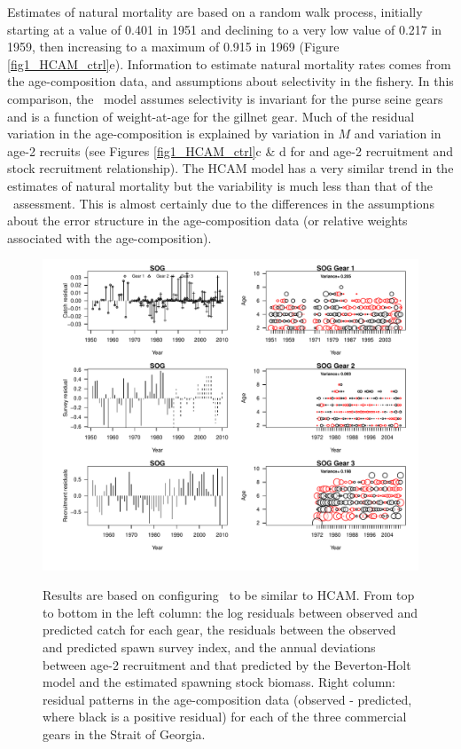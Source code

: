 Estimates of natural mortality are based on a random walk process, initially starting at a value of 0.401 in 1951 and declining to a very low value of 0.217 in 1959, then increasing to a maximum of 0.915 in 1969 (Figure \ref{fig1_HCAM_ctrl}e).  Information to estimate natural mortality rates comes from the age-composition data, and assumptions about selectivity in the fishery.  In this comparison, the \iscam\ model assumes selectivity is invariant for the purse seine gears and is a function of weight-at-age for the gillnet gear. Much of the residual variation in the age-composition is explained by variation in $M$ and variation in age-2 recruits (see Figures \ref{fig1_HCAM_ctrl}c \& d for and age-2 recruitment and stock recruitment relationship).  The HCAM model has a very similar trend in the estimates of natural mortality but the variability is much less than that of the \iscam\ assessment.  This is almost certainly due to the differences in the assumptions about the error structure in the age-composition data (or relative weights associated with the age-composition).




\begin{figure}[!tbp]
	\includegraphics[width=\textwidth]{../FIGS/iscam_fig_HCAM_SOG_RES.pdf}\\
	\caption{Results are based on configuring \iscam\ to be similar to HCAM. From top to bottom in the left column: the log residuals between observed and predicted catch for each gear, the residuals between the observed and predicted spawn survey index, and the annual deviations between age-2 recruitment and that predicted by the Beverton-Holt model and the estimated spawning stock biomass. Right column: residual patterns in the age-composition data (observed - predicted, where black is a positive residual) for each of the three commercial gears in the Strait of Georgia.}\label{fig_HCAM_SOG_RES}
\end{figure}

